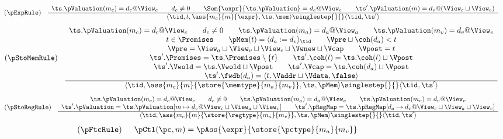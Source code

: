 \begin{figure}
%
\[
\begin{array}{cc}
(\pExpRule)
&
\begin{array}{c}
\ts.\pValuation(m_c)=d_c@\View_c \qquad d_c \neq 0 \qquad
\Sem{\expr}{\ts.\pValuation}=d_e@\View_e \qquad
\ts'.\pValuation(m) = d_e@(\View_c\sqcup\View_e)
\\ \hline
\langle \tid,t,\ass{m_c}{m}{\expr},\ts,\mem\rangle
\singlestep{}{}
\langle \tid,\ts'\rangle
\end{array}
\end{array}
\]
%
\[
\begin{array}{cc}
(\pStoMemRule)
&
\begin{array}{c}
\ts.\pValuation(m_c) = d_c@\View_c \qquad
d_c\neq 0 \qquad \ts.\pValuation(m_a) = d_a@\View_a \qquad
\ts.\pValuation(m_v) = d_v@\View_v \\
t\in \Promises \qquad \pMem(t) = \langle d_a:=d_v\rangle_\tid \qquad
\Vpre\sqcup\coh(d_a) < t \\
\Vpre = \View_a\sqcup \View_v \sqcup \View_c \sqcup \Vwnew\sqcup \Vcap \qquad
\Vpost = t \\
\ts'.\Promises = \ts.\Promises\setminus\{t\} \qquad
\ts'.\coh(l) = \ts.\coh(l)\sqcup \Vpost \\
\ts'.\Vwold = \ts.\Vwold\sqcup \Vpost \qquad
\ts'.\Vcap = \ts.\coh(d_a) \sqcup\Vpost \\
\ts'.\fwdb(d_a) = \langle t,\Vaddr \sqcup\Vdata,\false\rangle \\ \hline
\langle \tid,\ass{m_c}{m}{\store{\memtype}{m_a}{m_v}},\ts,\pMem\rangle
\singlestep{}{}
\langle\tid,\ts'\rangle
\end{array}
\end{array}
\]
%
\[
\begin{array}{cc}
(\pStoRegRule)
&
\begin{array}{c}
\ts.\pValuation(m_c) = d_c@\View_c \qquad d_c \neq 0 \qquad
\ts.\pValuation(m_a) = d_a@\View_a \qquad \ts.\pValuation(m_v)  = d_v@\View_v \\
\ts'.\pValuation = \ts.\pValuation[m\mapsto d_v @ \View_c\sqcup\View_a\sqcup\View_v] \qquad
\ts'.\pRegMap = \ts.\pRegMap[d_a \mapsto d_v @ \View_c\sqcup\View_a\sqcup\View_v]
\\ \hline
\langle \tid,\ass{m_c}{m}{\store{\regtype}{m_a}{m_v}},\ts,\pMem\rangle
\singlestep{}{}
\langle\tid,\ts'\rangle
\end{array}
\end{array}
\]
%
\[
\begin{array}{cc}
(\pFtcRule)
&
\begin{array}{c}
\pCtl(\pc,m) = \pAss{\expr}{\store{\pctype}{m_a}{m_v}} \qquad




\end{array}
\end{array}\]
\end{figure}
